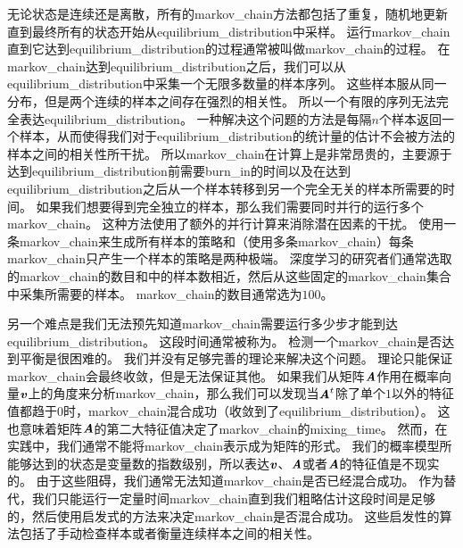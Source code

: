 无论状态是连续还是离散，所有的\gls{markov_chain}方法都包括了重复，随机地更新直到最终所有的状态开始从\gls{equilibrium_distribution}中采样。
运行\gls{markov_chain}直到它达到\gls{equilibrium_distribution}的过程通常被叫做\gls{markov_chain}的过程。
在\gls{markov_chain}达到\gls{equilibrium_distribution}之后，我们可以从\gls{equilibrium_distribution}中采集一个无限多数量的样本序列。
这些样本服从同一分布，但是两个连续的样本之间存在强烈的相关性。
所以一个有限的序列无法完全表达\gls{equilibrium_distribution}。
一种解决这个问题的方法是每隔$n$个样本返回一个样本，从而使得我们对于\gls{equilibrium_distribution}的统计量的估计不会被方法的样本之间的相关性所干扰。
所以\gls{markov_chain}在计算上是非常昂贵的，主要源于达到\gls{equilibrium_distribution}前需要\gls{burn_in}的时间以及在达到\gls{equilibrium_distribution}之后从一个样本转移到另一个完全无关的样本所需要的时间。
如果我们想要得到完全独立的样本，那么我们需要同时并行的运行多个\gls{markov_chain}。
这种方法使用了额外的并行计算来消除潜在因素的干扰。
使用一条\gls{markov_chain}来生成所有样本的策略和（使用多条\gls{markov_chain}）每条\gls{markov_chain}只产生一个样本的策略是两种极端。
深度学习的研究者们通常选取的\gls{markov_chain}的数目和中的样本数相近，然后从这些固定的\gls{markov_chain}集合中采集所需要的样本。
\gls{markov_chain}的数目通常选为$100$。

另一个难点是我们无法预先知道\gls{markov_chain}需要运行多少步才能到达\gls{equilibrium_distribution}。 
这段时间通常被称为。
检测一个\gls{markov_chain}是否达到平衡是很困难的。
我们并没有足够完善的理论来解决这个问题。
理论只能保证\gls{markov_chain}会最终收敛，但是无法保证其他。
如果我们从矩阵$\boldsymbol{\mathit{A}}$作用在概率向量$\boldsymbol{\mathit{v}}$上的角度来分析\gls{markov_chain}，那么我们可以发现当$\boldsymbol{\mathit{A}}^t$除了单个$1$以外的特征值都趋于$0$时，\gls{markov_chain}混合成功（收敛到了\gls{equilibrium_distribution}）。
这也意味着矩阵$\boldsymbol{\mathit{A}}$的第二大特征值决定了\gls{markov_chain}的\gls{mixing_time}。
然而，在实践中，我们通常不能将\gls{markov_chain}表示成为矩阵的形式。
我们的概率模型所能够达到的状态是变量数的指数级别，所以表达$\boldsymbol{\mathit{v}}$、$\boldsymbol{\mathit{A}}$或者$\boldsymbol{\mathit{A}}$的特征值是不现实的。
由于这些阻碍，我们通常无法知道\gls{markov_chain}是否已经混合成功。
作为替代，我们只能运行一定量时间\gls{markov_chain}直到我们粗略估计这段时间是足够的，然后使用启发式的方法来决定\gls{markov_chain}是否混合成功。
这些启发性的算法包括了手动检查样本或者衡量连续样本之间的相关性。



\section{}
\label{sec:gibbs_sampling}

